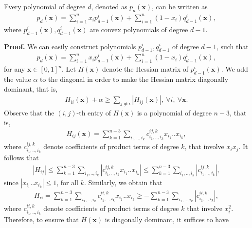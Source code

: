 \documentclass[10pt,a4paper]{amsart}
\renewenvironment{proof}[1]{\par\medskip\noindent\textbf{#1}\enspace\ignorespaces}{\par\medskip}
\begin{document}
\begin{theorem} 
\label{thm:arb_degree_first}
Every polynomial of degree $d$, denoted as $p_d(\boldsymbol{x})$, can be written as 
\begin{align*}
    p_d(\boldsymbol{x}) = \sum_{i=1}^n x_i p_{d-1}^i(\boldsymbol{x}) + \sum_{i=1}^n \left(1 - x_i \right) q_{d-1}^i(\boldsymbol{x}),
\end{align*}  
where $p_{d-1}^i(\boldsymbol{x}), q_{d-1}^i(\boldsymbol{x})$ are convex polynomials of degree $d-1$. 
\end{theorem} 

\begin{proof}{Proof. } 
We can easily construct polynomials $p_{d-1}^i, q_{d-1}^i$ of degree $d-1$, such that 
\begin{align*}
    p_d(\boldsymbol{x}) = \sum_{i=1}^n x_i p_{d-1}^i(\boldsymbol{x}) + \sum_{i=1}^n (1-x_i) q_{d-1}^i(\boldsymbol{x}),
\end{align*} 
for any $\boldsymbol{x} \in [0,1]^n$. Let $H(\boldsymbol{x})$ denote the Hessian matrix of $p_{d-1}^i(\boldsymbol{x})$. We add the value $\alpha$ to the diagonal in order to make the Hessian matrix diagonally dominant, that is,  
\begin{align*}
    H_{ii}(\boldsymbol{x}) + \alpha \ge \sum_{j \neq i} |H_{ij}(\boldsymbol{x})|, \ \forall i, \: \forall \boldsymbol{x}.
\end{align*}
Observe that the $(i,j)$-th entry of $H(\boldsymbol{x})$ is a polynomial of degree $n-3$, that is,
\begin{align*}
    H_{ij}(\boldsymbol{x}) = \sum_{k=1}^{n-3} \sum_{i_1,..,i_k} c_{i_1,..,i_k}^{ij, k} x_{i_1}..x_{i_k},
\end{align*}  
where $c_{i_1,..,i_k}^{ij, k}$ denote coefficients of product terms of degree $k$, that involve $x_i x_j$. It follows that 
\begin{align*}
    |H_{ij}| \le \sum_{k=1}^{n-3} \sum_{i_1,..,i_k} \left \lvert c_{i_1,..,i_k}^{ij, k} x_{i_1}..x_{i_k} \right \rvert \le \sum_{k=1}^{n-3} \sum_{i_1,..,i_k} \left \lvert c_{i_1,..,i_k}^{ij, k} \right \rvert, 
\end{align*}
since $\left \lvert x_{i_1}..x_{i_k} \right \rvert \le 1$, for all $k$. Similarly, we obtain that 
\begin{align*}
    H_{ii} = \sum_{k=1}^{n-3} \sum_{i_1,..,i_k} c_{i_1,..,i_k}^{ii, k} x_{i_1}..x_{i_k} \ge -\sum_{k=1}^{n-3} \sum_{i_1,..,i_k} \left \lvert c_{i_1,..,i_k}^{ii, k} \right \rvert,
\end{align*}  
where $c_{i_1,..,i_k}^{ii, k}$ denote coefficients of product terms of degree $k$ that involve $x_i^2$. Therefore, to ensure that $H(\boldsymbol{x})$ is diagonally dominant, it suffices to have 

\end{proof}
\end{document}
